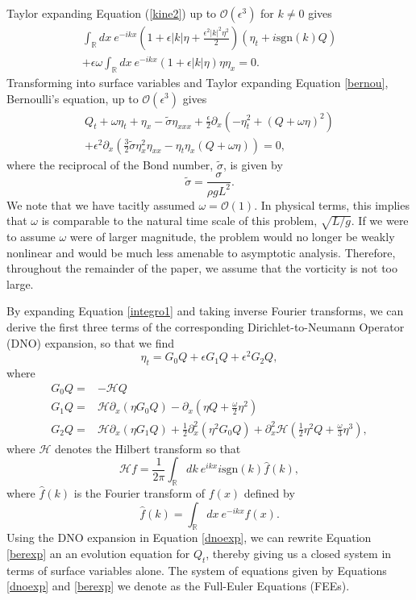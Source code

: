 \documentclass[a4paper,11pt]{article}
\newcommand{\pd}{\partial}
\begin{document}
Taylor expanding Equation (\ref{kine2}) up to $\mathcal{O}(\epsilon^3)$ for $k\neq 0$ gives
\begin{multline}
\int_{\mathbb{R}}dx~e^{-ikx}\left(1 + \epsilon |k|\eta + \frac{\epsilon^{2}|k|^{2}\eta^{2}}{2} \right)\left(\eta_{t} + i \mbox{sgn}(k)Q \right) \\
+ \epsilon \omega \int_{\mathbb{R}}dx~e^{-ikx}\left(1 + \epsilon |k|\eta \right) \eta \eta_{x} = 0.
\label{integro1}
\end{multline}
Transforming into surface variables and Taylor expanding Equation \eqref{bernou}, Bernoulli's equation, up to $\mathcal{O}(\epsilon^3)$ gives
\begin{multline}
Q_{t} + \omega \eta_{t} + \eta_{x} - \tilde{\sigma}\eta_{xxx} + \frac{\epsilon}{2}\pd_{x}\left(-\eta_{t}^{2} + (Q+\omega \eta)^{2} \right)\\
+ \epsilon^{2}\pd_{x}\left( \frac{3}{2}\tilde{\sigma}\eta_{x}^{2}\eta_{xx} - \eta_{t}\eta_{x} \left(Q  + \omega \eta \right) \right)  = 0,
\label{berexp}
\end{multline}
where the reciprocal of the Bond number, $\tilde{\sigma}$, is given by
\[
\tilde{\sigma} = \frac{\sigma}{\rho g L^2}.
\]
We note that we have tacitly assumed $\omega = \mathcal{O}(1)$.  In physical terms, this implies that $\omega$ is comparable to the natural time scale of this problem, $\sqrt{L/g}$.  If we were to assume $\omega$ were of larger magnitude, the problem would no longer be weakly nonlinear and would be much less amenable to asymptotic analysis.  Therefore, throughout the remainder of the paper, we assume that the vorticity is not too large.

By expanding Equation \eqref{integro1} and taking inverse Fourier transforms, we can derive the first three terms of the corresponding Dirichlet-to-Neumann Operator (DNO) expansion, so that we find
\begin{equation}
\eta_{t} = G_{0}Q + \epsilon G_{1}Q + \epsilon^{2}G_{2}Q,
\label{dnoexp}
\end{equation}
where
\begin{align*}
G_{0}Q = & -\mathcal{H}Q\\
G_{1}Q = & \mathcal{H}\pd_{x}\left(\eta G_{0}Q\right) - \pd_{x}\left(\eta Q + \frac{\omega}{2}\eta^{2}\right)\\
G_{2}Q = & \mathcal{H}\pd_{x}\left(\eta G_{1}Q\right) + \frac{1}{2}\pd_{x}^{2}\left(\eta^{2}G_{0}Q \right) + \pd_{x}^{2}\mathcal{H}\left(\frac{1}{2}\eta^{2}Q + \frac{\omega}{3}\eta^{3}\right), 
\end{align*}
where $\mathcal{H}$ denotes the Hilbert transform so that 
\[
\mathcal{H}f = \frac{1}{2\pi}\int_{\mathbb{R}}dk~ e^{ikx}  i\mbox{sgn}(k) \hat{f}(k),
\]
where $\hat{f}(k)$ is the Fourier transform of $f(x)$ defined by
\[
\hat{f}(k) = \int_{\mathbb{R}}dx~ e^{-ikx}f(x).
\]
Using the DNO expansion in Equation \eqref{dnoexp}, we can rewrite Equation \eqref{berexp} an an evolution equation for $Q_{t}$, thereby giving us a closed system in terms of surface variables alone.  The system of equations given by Equations \eqref{dnoexp} and \eqref{berexp} we denote as the Full-Euler Equations (FEEs).  
\end{document}
